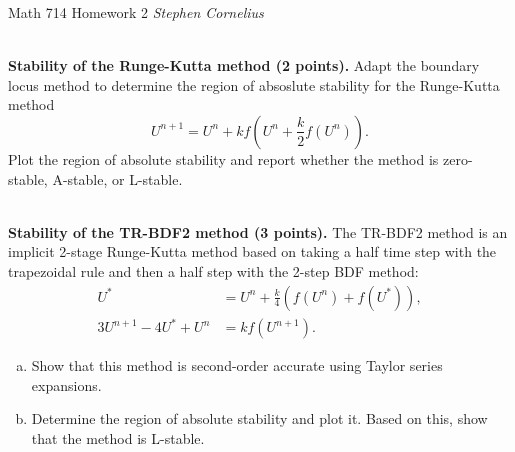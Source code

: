 \documentclass{article}
\begin{document}
\begin{center}
    Math 714
    \hfill Homework 2
    \hfill \textit{Stephen Cornelius}
\end{center}

\begin{problem} \\
    \textbf{Stability of the Runge-Kutta method (2 points).} Adapt the boundary locus method to determine the region of absoslute stability for the Runge-Kutta method 
    \[
        U^{n+1} = U^n + kf\left( U^n + \frac{k}{2}f(U^n) \right).
    \]
    Plot the region of absolute stability and report whether the method is zero-stable, A-stable, or L-stable.
\end{problem}



\begin{problem} \\
    \textbf{Stability of the TR-BDF2 method (3 points).} The TR-BDF2 method is an implicit 2-stage Runge-Kutta method based on taking a half time step with the trapezoidal rule and then a half step with the 2-step BDF method:
    \begin{align*}
        U^{*} &= U^n + \frac{k}{4}\left( f(U^n) + f(U^{*}) \right), \\
        3U^{n+1} - 4U^{*} + U^n &= k f(U^{n+1}).
    \end{align*}
    \begin{enumerate}[(a)]
        \item Show that this method is second-order accurate using Taylor series expansions.
        \item Determine the region of absolute stability and plot it. Based on this, show that the method is L-stable.
    \end{enumerate}
\end{problem}
\end{document}
